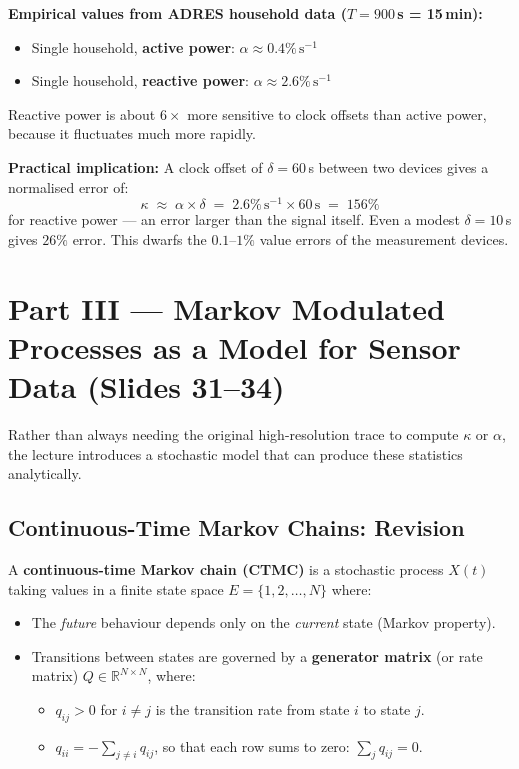 \begin{resultbox}
\textbf{Empirical values from ADRES household data
($T = 900$\,s = 15\,min):}
\begin{itemize}[itemsep=3pt]
  \item Single household, \textbf{active power}:
        $\alpha \approx 0.4\%\,\mathrm{s}^{-1}$
  \item Single household, \textbf{reactive power}:
        $\alpha \approx 2.6\%\,\mathrm{s}^{-1}$
\end{itemize}
Reactive power is about $6\times$ more sensitive to clock offsets
than active power, because it fluctuates much more rapidly.
\end{resultbox}
 
\begin{warnbox}
\textbf{Practical implication:} A clock offset of
$\delta = 60$\,s between two devices gives a normalised error
of:
\[
  \kappa \;\approx\; \alpha \times \delta
  \;=\; 2.6\%\,\mathrm{s}^{-1} \times 60\,\mathrm{s}
  \;=\; 156\%
\]
for reactive power --- an error larger than the signal itself.
Even a modest $\delta = 10$\,s gives $26\%$ error. This dwarfs
the $0.1$--$1\%$ value errors of the measurement devices.
\end{warnbox}
 
\section{Part III --- Markov Modulated Processes as a Model
for Sensor Data (Slides 31--34)}
 
Rather than always needing the original high-resolution trace to
compute $\kappa$ or $\alpha$, the lecture introduces a stochastic
model that can produce these statistics analytically.
 
\subsection{Continuous-Time Markov Chains: Revision}
 
A \textbf{continuous-time Markov chain (CTMC)} is a stochastic
process $X(t)$ taking values in a finite state space
$E = \{1, 2, \ldots, N\}$ where:
 
\begin{itemize}[itemsep=4pt]
  \item The \emph{future} behaviour depends only on the
        \emph{current} state (Markov property).
  \item Transitions between states are governed by a
        \textbf{generator matrix} (or rate matrix) $Q \in
        \mathbb{R}^{N \times N}$, where:
        \begin{itemize}
          \item $q_{ij} > 0$ for $i \neq j$ is the transition
                rate from state $i$ to state $j$.
          \item $q_{ii} = -\sum_{j \neq i} q_{ij}$, so that
                each row sums to zero:
                $\displaystyle\sum_{j} q_{ij} = 0$.
        \end{itemize}
\end{itemize}
 
